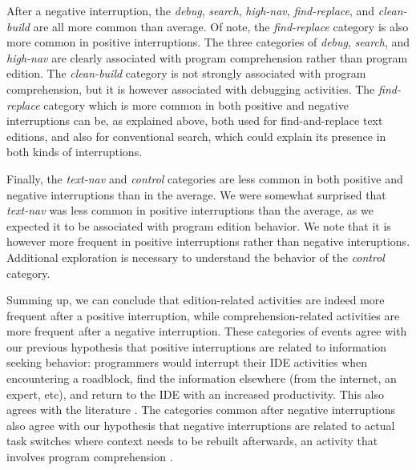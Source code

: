 \documentclass[times]{smrauth}
\newcommand\RR[1]{\textbf{Romain #1}}
\begin{document}
After a negative interruption, the \emph{debug}, \emph{search}, \emph{high-nav}, \emph{find-replace}, and \emph{clean-build} are all more common than average. Of note, the \emph{find-replace} category is also more common in positive interruptions. The three categories of \emph{debug}, \emph{search}, and \emph{high-nav} are clearly associated with program comprehension rather than program edition. The \emph{clean-build} category is not strongly associated with program comprehension, but it is however associated with debugging activities. The \emph{find-replace} category which is more common in both positive and negative interruptions can be, as explained above, both used for find-and-replace text editions, and also for conventional search, which could explain its presence in both kinds of interruptions.

Finally, the \emph{text-nav} and \emph{control} categories are less common in both positive and negative interruptions than in the average. We were somewhat surprised that \emph{text-nav} was less common in positive interruptions than the average, as we expected it to be associated with program edition behavior. We note that it is however more frequent in positive interruptions rather than negative interuptions. Additional exploration is necessary to understand the behavior of the \emph{control} category.

Summing up, we can conclude that edition-related activities are indeed more frequent after a positive interruption, while comprehension-related activities are more frequent after a negative interruption.  These categories of events agree with our previous hypothesis that positive interruptions are related to information seeking behavior: programmers would interrupt their IDE activities when encountering a roadblock, find the information elsewhere (from the internet, an expert, etc), and return to the IDE with an increased productivity. This also agrees with the literature \cite{PR11, LVD06}. The categories common after negative interruptions  also agree with our hypothesis that negative interruptions are related to actual task switches where context needs to be rebuilt afterwards, an activity that involves program comprehension \cite{MMLK14, PR12}. %

\end{document}
